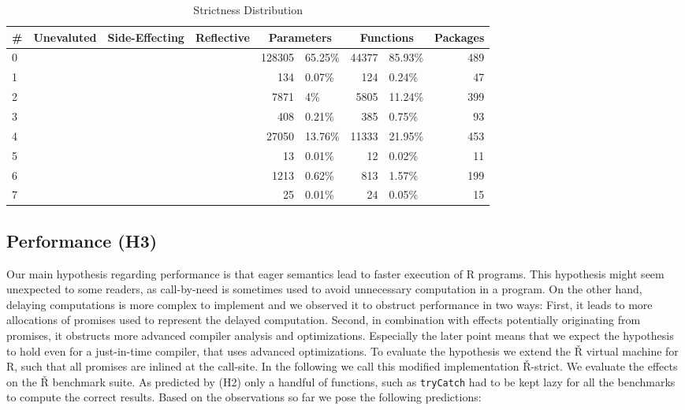 \documentclass[review,nonacm,screen,acmsmall,anonymous=true]{acmart}
\newcommand{\xmark}{\color{red} \ding{55}}
\newcommand{\cmark}{\color{green} \ding{51}}
\begin{document}
\begin{table}
  \vspace{-3mm}
  \small
  \caption{Strictness Distribution} \label{table:strictdist}
  \centering
  \begin{tabular}{lcccr|lr|lr}
    \toprule
    \#&\bf Unevaluted & \bf Side-Effecting & \bf Reflective & \multicolumn{2}{c}{\textbf{Parameters}} & \multicolumn{2}{c}{\textbf{Functions}}& \bf Packages\\
    \midrule
    0&\xmark{}&\xmark{}&\xmark{}&128305&65.25\%&44377&85.93\%&489\\
    1&\xmark{}&\xmark{}&\cmark{}&134&0.07\%&124&0.24\%&47\\
    2&\xmark{}&\cmark{}&\xmark{}&7871&4\%&5805&11.24\%&399\\
    3&\xmark{}&\cmark{}&\cmark{}&408&0.21\%&385&0.75\%&93\\
    4&\cmark{}&\xmark{}&\xmark{}&27050&13.76\%&11333&21.95\%&453\\
    5&\cmark{}&\xmark{}&\cmark{}&13&0.01\%&12&0.02\%&11\\
    6&\cmark{}&\cmark{}&\xmark{}&1213&0.62\%&813&1.57\%&199\\
    7&\cmark{}&\cmark{}&\cmark{}&25&0.01\%&24&0.05\%&15\\
    \bottomrule
  \end{tabular}
\end{table}

\subsection{Performance (H3)}

Our main hypothesis regarding performance is that eager semantics lead to faster
execution of R programs. This hypothesis might seem
unexpected to some readers, as call-by-need is sometimes used to avoid
unnecessary computation in a program. On the other hand, delaying computations
is more complex to implement and we observed it to obstruct performance
in two ways: First, it leads to more allocations of promises used to represent
the delayed computation. Second, in combination with effects potentially
originating from promises, it obstructs more advanced compiler analysis and
optimizations. Especially the later point means that we expect the hypothesis to
hold even for a just-in-time compiler, that uses advanced optimizations.
To evaluate the hypothesis we extend the Ř virtual machine for R, such that all
promises are inlined at the call-site. In the following we call this modified
implementation Ř-strict. We evaluate the effects on the Ř benchmark
suite. As predicted by (H2) only a handful of functions, such as
\lstinline{tryCatch} had to be kept lazy for all the benchmarks to compute the
correct results. Based on the observations so far we pose the following predictions:
\end{document}
